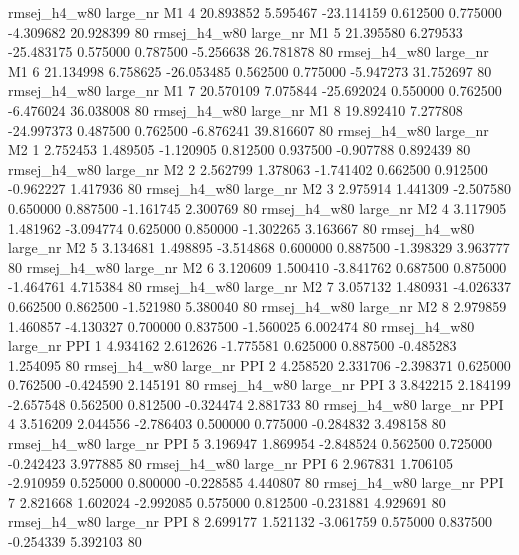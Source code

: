 rmsej_h4_w80   large_nr       M1                 4 20.893852  5.595467 -23.114159 0.612500 0.775000 -4.309682   20.928399 80
rmsej_h4_w80   large_nr       M1                 5 21.395580  6.279533 -25.483175 0.575000 0.787500 -5.256638   26.781878 80
rmsej_h4_w80   large_nr       M1                 6 21.134998  6.758625 -26.053485 0.562500 0.775000 -5.947273   31.752697 80
rmsej_h4_w80   large_nr       M1                 7 20.570109  7.075844 -25.692024 0.550000 0.762500 -6.476024   36.038008 80
rmsej_h4_w80   large_nr       M1                 8 19.892410  7.277808 -24.997373 0.487500 0.762500 -6.876241   39.816607 80
rmsej_h4_w80   large_nr       M2                 1  2.752453  1.489505  -1.120905 0.812500 0.937500 -0.907788    0.892439 80
rmsej_h4_w80   large_nr       M2                 2  2.562799  1.378063  -1.741402 0.662500 0.912500 -0.962227    1.417936 80
rmsej_h4_w80   large_nr       M2                 3  2.975914  1.441309  -2.507580 0.650000 0.887500 -1.161745    2.300769 80
rmsej_h4_w80   large_nr       M2                 4  3.117905  1.481962  -3.094774 0.625000 0.850000 -1.302265    3.163667 80
rmsej_h4_w80   large_nr       M2                 5  3.134681  1.498895  -3.514868 0.600000 0.887500 -1.398329    3.963777 80
rmsej_h4_w80   large_nr       M2                 6  3.120609  1.500410  -3.841762 0.687500 0.875000 -1.464761    4.715384 80
rmsej_h4_w80   large_nr       M2                 7  3.057132  1.480931  -4.026337 0.662500 0.862500 -1.521980    5.380040 80
rmsej_h4_w80   large_nr       M2                 8  2.979859  1.460857  -4.130327 0.700000 0.837500 -1.560025    6.002474 80
rmsej_h4_w80   large_nr      PPI                 1  4.934162  2.612626  -1.775581 0.625000 0.887500 -0.485283    1.254095 80
rmsej_h4_w80   large_nr      PPI                 2  4.258520  2.331706  -2.398371 0.625000 0.762500 -0.424590    2.145191 80
rmsej_h4_w80   large_nr      PPI                 3  3.842215  2.184199  -2.657548 0.562500 0.812500 -0.324474    2.881733 80
rmsej_h4_w80   large_nr      PPI                 4  3.516209  2.044556  -2.786403 0.500000 0.775000 -0.284832    3.498158 80
rmsej_h4_w80   large_nr      PPI                 5  3.196947  1.869954  -2.848524 0.562500 0.725000 -0.242423    3.977885 80
rmsej_h4_w80   large_nr      PPI                 6  2.967831  1.706105  -2.910959 0.525000 0.800000 -0.228585    4.440807 80
rmsej_h4_w80   large_nr      PPI                 7  2.821668  1.602024  -2.992085 0.575000 0.812500 -0.231881    4.929691 80
rmsej_h4_w80   large_nr      PPI                 8  2.699177  1.521132  -3.061759 0.575000 0.837500 -0.254339    5.392103 80
